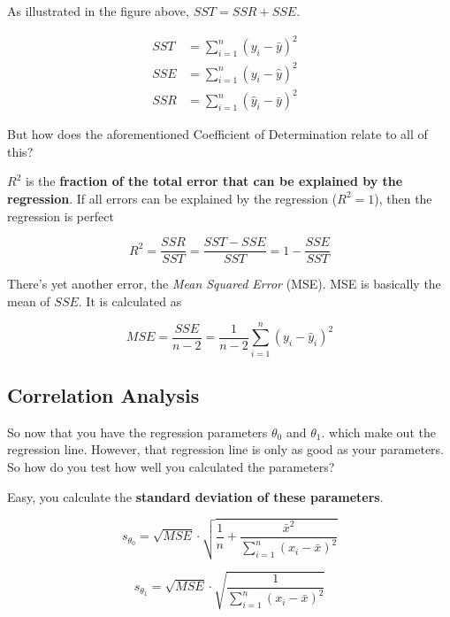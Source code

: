 \documentclass[11pt]{article}
\begin{document}
\vspace{10px}

As illustrated in the figure above, $SST = SSR + SSE$.

\begin{align}
    SST & = \sum^{n}_{i=1}(y_{i}-\bar y)^2        \\
    SSE & = \sum^{n}_{i=1}(y_{i}-\hat y)^2      & \\
    SSR & = \sum^{n}_{i=1}(\hat y_{i}-\bar y)^2
\end{align}


But how does the aforementioned Coefficient of Determination relate to all of this?

$R^2$ is the \textbf{fraction of the total error that can be explained by the regression}. If all errors can be explained by the regression ($R^2 = 1$), then the regression is perfect

\begin{equation}
    R^2 = \frac{SSR}{SST} = \frac{SST-SSE}{SST} = 1 - \frac{SSE}{SST}
\end{equation}

\vspace{10px}

There's yet another error, the \textit{Mean Squared Error} (MSE). MSE is basically the mean of $SSE$. It is calculated as

\begin{equation}
    MSE = \frac{SSE}{n-2} = \frac{1}{n-2}\sum_{i=1}^{n}(y_{i}-\hat{y}^{}_{i})^2
\end{equation}

\newpage

\subsection{Correlation Analysis}

So now that you have the regression parameters $\theta^{}_{0}$ and $\theta^{}_{1}$. which make out the regression line. However, that regression line is only as good as your parameters. So how do you test how well you calculated the parameters?

Easy, you calculate the \textbf{standard deviation of these parameters}.

\begin{equation}
    s_{\theta_{0}} = \sqrt{MSE} \cdot \sqrt{\frac{1}{n} + \frac{\bar{x}^2}{\sum_{i=1}^{n}{(x_i-\bar{x})^2}}}
\end{equation}

\begin{equation}
    s_{\theta_{1}} = \sqrt{MSE}\cdot \sqrt{\frac{1}{\sum_{i=1}^{n}{(x_i-\bar{x})^2}}}
\end{equation}
\end{document}
